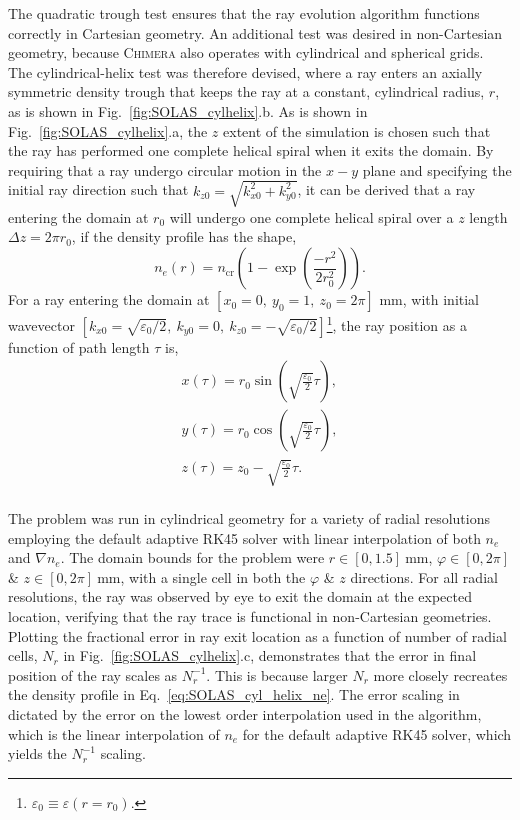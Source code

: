 The quadratic trough test ensures that the ray evolution algorithm functions correctly in Cartesian geometry.
An additional test was desired in non-Cartesian geometry, because \textsc{Chimera} also operates with cylindrical and spherical grids.
The cylindrical-helix test was therefore devised, where a ray enters an axially symmetric density trough that keeps the ray at a constant, cylindrical radius, $r$, as is shown in Fig.~\ref{fig:SOLAS_cylhelix}.b.
As is shown in Fig.~\ref{fig:SOLAS_cylhelix}.a, the $z$ extent of the simulation is chosen such that the ray has performed one complete helical spiral when it exits the domain.
By requiring that a ray undergo circular motion in the $x-y$ plane and specifying the initial ray direction such that $k_{z0}=\sqrt{k_{x0}^2+k_{y0}^2}$, it can be derived that a ray entering the domain at $r_0$ will undergo one complete helical spiral over a $z$ length $\Delta z= 2\pi r_0$, if the density profile has the shape,
\begin{equation}
    \label{eq:SOLAS_cyl_helix_ne}
    n_e(r) = n_{\text{cr}} \left( 1-\exp{\left( \frac{-r^2}{2r_0^2} \right)} \right).
\end{equation}
For a ray entering the domain at $[x_0=0,\ y_0=1,\ z_0=2\pi]$ mm, with initial wavevector $[k_{x0}=\sqrt{\varepsilon_0/2},\ k_{y0}=0,\ k_{z0}=-\sqrt{\varepsilon_0/2}]$\footnote{$\varepsilon_0\equiv\varepsilon(r=r_0)$.}, the ray position as a function of path length $\tau$ is,
\begin{equation}
    \begin{gathered}
        x(\tau) = r_0\sin{\left( \sqrt{\frac{\varepsilon_0}{2}}\tau \right)}, \\
        y(\tau) = r_0\cos{\left( \sqrt{\frac{\varepsilon_0}{2}}\tau \right)}, \\
        z(\tau) = z_0 - \sqrt{\frac{\varepsilon_0}{2}}\tau. \\
    \end{gathered}
\end{equation}

The problem was run in cylindrical geometry for a variety of radial resolutions employing the default adaptive RK45 solver with linear interpolation of both $n_e$ and $\nabla n_e$.
The domain bounds for the problem were $r \in [0,1.5]\ \text{mm}$, $\varphi \in [0,2\pi]$ \& $z \in [0,2\pi]\ \text{mm}$, with a single cell in both the $\varphi$ \& $z$ directions.
For all radial resolutions, the ray was observed by eye to exit the domain at the expected location, verifying that the ray trace is functional in non-Cartesian geometries.
Plotting the fractional error in ray exit location as a function of number of radial cells, $N_r$ in Fig.~\ref{fig:SOLAS_cylhelix}.c, demonstrates that the error in final position of the ray scales as $N_r^{-1}$.
This is because larger $N_r$ more closely recreates the density profile in Eq.~\ref{eq:SOLAS_cyl_helix_ne}.
The error scaling in dictated by the error on the lowest order interpolation used in the algorithm, which is the linear interpolation of $n_e$ for the default adaptive RK45 solver, which yields the $N_r^{-1}$ scaling.

